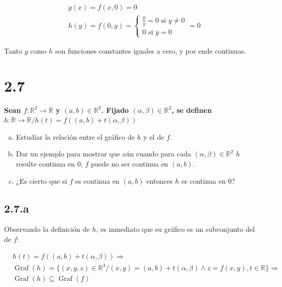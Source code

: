 \documentclass{article}
\renewcommand{\Bbb}{\mathbb}
\begin{document}
\begin{align}
& g(x) = f(x,0) = 0 \\
& h(y) = f(0,y) = \left\{ \begin{array}{ll}
\frac{0}{y} = 0 \text{ si } y \neq 0 \\
0 \text{ si } y = 0
\end{array} \right. = 0
\end{align}

Tanto $g$ como $h$ son funciones constantes iguales a cero, y por ende continuas.

\section*{2.7}
\label{sec:2.7}

\textbf{Sean $f: \Bbb R^2 \rightarrow \Bbb R$ y $(a, b) \in \Bbb R^2$. Fijado $(\alpha, \beta) \in \Bbb R^2$, se definen $h:\Bbb R \rightarrow \Bbb R / h(t) = f((a,b) + t(\alpha, \beta))$}

\begin{enumerate}[(a)]
\bfseries

\item Estudiar la relación entre el gráfico de $h$ y el de $f$.

\item Dar un ejemplo para mostrar que aún cuando para cada $(\alpha, \beta) \in \Bbb R^2$ $h$ resulte continua en 0, $f$ puede no ser continua en $(a,b)$.

\item ¿Es cierto que si $f$ es continua en $(a,b)$ entonces $h$ es continua en 0?

\end{enumerate}

\subsection*{2.7.a}
\label{subsec:2.7.a}

Observando la definición de $h$, es inmediato que su gráfico es un subconjunto del de $f$:

\begin{subequations}
\begin{align}
& h(t) = f((a,b) + t(\alpha, \beta)) \Rightarrow \\
& \mathop{Graf}(h) = \{ (x,y,z) \in \Bbb R^3 / (x,y) = (a,b) + t(\alpha, \beta) \wedge z = f(x,y), t \in \Bbb R \} \Rightarrow \\
& \mathop{Graf}(h) \subseteq \mathop{Graf}(f)
\end{align}
\end{subequations}
\end{document}
